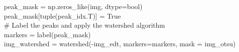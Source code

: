 \documentclass[9pt, aspectratio=169]{beamer}
\begin{document}
\begin{frame}
\begin{columns}
\begin{column}{.7\textwidth}
{\begin{codebox}
{                        peak\_mask = np.zeros\_like(img, dtype=bool)\\
                        peak\_mask[tuple(peak\_idx.T)] = True\\
                        \pause
                        \# Label the peaks and apply the watershed algorithm\\
                        markers = label(peak\_mask)\\
                        img\_watershed = watershed(-img\_edt, markers=markers, mask = img\_otsu)
                    }
                \end{codebox}
            }
        \end{column}
        \begin{column}{.3\textwidth}


\end{column}
\end{columns}
\end{frame}
\end{document}
